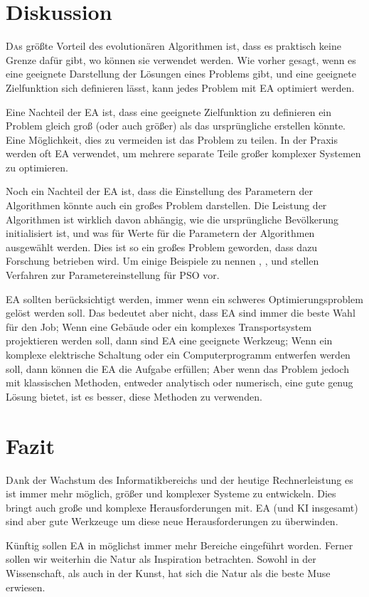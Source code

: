 \documentclass[twoside,twocolumn]{article}
\begin{document}

\section{Diskussion}
\lettrine[nindent=0em,lines=3]{D} as größte Vorteil des evolutionären Algorithmen ist, dass es praktisch keine Grenze dafür gibt, wo können sie verwendet werden. Wie vorher gesagt, wenn es eine geeignete Darstellung der Lösungen eines Problems gibt, und eine geeignete Zielfunktion sich definieren lässt, kann jedes Problem mit EA optimiert werden.\par
Eine Nachteil der EA ist, dass eine geeignete Zielfunktion zu definieren ein Problem gleich groß (oder auch größer) als das ursprüngliche erstellen könnte. Eine Möglichkeit, dies zu vermeiden ist das Problem zu teilen. In der Praxis werden oft EA verwendet, um mehrere separate Teile großer komplexer Systemen zu optimieren.\par
Noch ein Nachteil der EA ist, dass die Einstellung des Parametern der Algorithmen könnte auch ein großes Problem darstellen. Die Leistung der Algorithmen ist wirklich davon abhängig, wie die ursprüngliche Bevölkerung initialisiert ist, und was für Werte für die Parametern der Algorithmen ausgewählt werden. Dies ist so ein großes Problem geworden, dass dazu Forschung betrieben wird. Um einige Beispiele zu nennen \cite{pso_tuning_a}, \cite{pso_tuning_b}, und \cite{pso_tuning_c} stellen Verfahren zur Parametereinstellung für PSO vor.\par
EA sollten berücksichtigt werden, immer wenn ein schweres Optimierungsproblem gelöst werden soll. Das bedeutet aber nicht, dass EA sind immer die beste Wahl für den Job; Wenn eine Gebäude oder ein komplexes Transportsystem projektieren werden soll, dann sind EA eine geeignete Werkzeug; Wenn ein komplexe elektrische Schaltung oder ein Computerprogramm entwerfen werden soll, dann können die EA die Aufgabe erfüllen; Aber wenn das Problem jedoch mit klassischen Methoden, entweder analytisch oder numerisch, eine gute genug Lösung bietet, ist es besser, diese Methoden zu verwenden.


\section{Fazit}

\lettrine[nindent=0em,lines=3]{D} ank der Wachstum des Informatikbereichs und der heutige Rechnerleistung es ist immer mehr möglich, größer und komplexer Systeme zu entwickeln. Dies bringt auch große und komplexe Herausforderungen mit. EA (und KI insgesamt) sind aber gute Werkzeuge um diese neue Herausforderungen zu überwinden.\par
Künftig sollen EA in möglichst immer mehr Bereiche eingeführt worden. Ferner sollen wir weiterhin die Natur als Inspiration betrachten. Sowohl in der Wissenschaft, als auch in der Kunst, hat sich die Natur als die beste Muse erwiesen.
\end{document}
